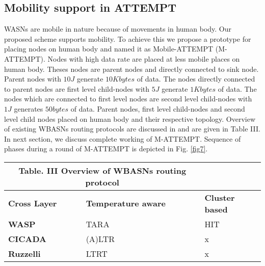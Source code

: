 \documentclass[journal]{IEEEtran}
\begin{document}
\subsection{Mobility support in ATTEMPT}
WASNs are mobile in nature because of movements in human body. Our proposed scheme supports mobility. To achieve this we propose a prototype for placing nodes on human body and named it as Mobile-ATTEMPT (M-ATTEMPT). Nodes with high data rate are placed at less mobile places on human body. Theses nodes are parent nodes and directly connected to sink node. Parent nodes with $10J$ generate $10 Kbytes$ of data. The nodes directly connected to parent nodes are first level child-nodes with $5J$ generate $1 Kbytes$ of data. The nodes which are connected to first level nodes are second level child-nodes with $1J$ generates $50 bytes$ of data. Parent nodes, first level child-nodes and second level child nodes placed on human body and their respective topology. Overview of existing WBASNs routing protocols are discussed in \cite{ullah2010comprehensive} and are given in Table III. In next section, we discuss complete working of M-ATTEMPT. Sequence of phases during a round of M-ATTEMPT is depicted in Fig. \ref{fig7}.

\begin{figure*}[ht]
  \centering
  \caption{Link establishment and link breakage due to mobility Of human body}\label{fig6}
\end{figure*}

\begin{figure*}[ht]
  \centering
  \caption{Sequence of phases in each round}\label{fig7}
\end{figure*}


\begin{table}[!ht]
\begin{center}
\begin{tabular}{| p{1.6cm} || p{1.5cm} || p{1.5cm} |}
   \multicolumn{2}{c}{Table. III Overview of WBASNs routing protocol}\\
  \hline
  \textbf{Cross Layer}                & \textbf{Temperature aware }&      \textbf{Cluster based}   \\ \hline \hline
   \textbf{WASP}                      & TARA	                   &       HIT \\ \hline
    \textbf{CICADA}                   & (A)LTR                     &       x\\ \hline
     \textbf{Ruzzelli}                & LTRT                       &       x\\ \hline

\end{tabular}
\end{center}
\end{table}
\end{document}
